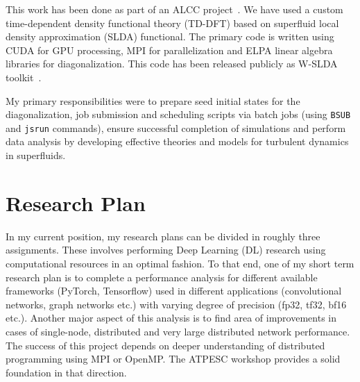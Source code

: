 \documentclass{article}
\begin{document}
This work has been done as part of an ALCC project~\cite{Alcc:2021}. We have 
used a custom time-dependent density functional theory (TD-DFT) based on 
superfluid local density approximation (SLDA) functional. The primary code is
written using CUDA for GPU processing, MPI for parallelization and ELPA linear
algebra libraries for diagonalization. This code has been released publicly as
W-SLDA toolkit~\cite{Bulgac:2014, W-slda:2023}.

My primary responsibilities were to prepare seed initial states for the 
diagonalization, job submission and scheduling scripts via batch jobs 
(using \verb|BSUB| and \verb|jsrun| commands),
ensure successful completion of simulations and perform data analysis by 
developing effective theories and models for turbulent dynamics in superfluids.

\section*{Research Plan}

In my current position, my research plans can be divided in roughly three 
assignments. These involves performing Deep Learning (DL) research using 
computational resources in an optimal fashion. To that end, one of my short 
term research plan is to complete a performance analysis for different available
frameworks (PyTorch, Tensorflow) used in different applications (convolutional
networks, graph networks etc.) with varying degree of precision (fp32, tf32, 
bf16 etc.). Another major aspect of this analysis is to find area
of improvements in cases of single-node, distributed and very large distributed
network performance. The success of this project depends on deeper 
understanding of distributed programming using MPI or OpenMP. The ATPESC 
workshop provides a solid foundation in that direction.
\end{document}
